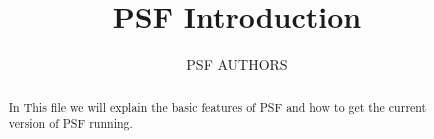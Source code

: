 \documentclass[a4paper,10pt]{article}
\title{PSF Introduction}
\author{PSF AUTHORS}
\begin{document}
\maketitle

\begin{abstract}
 In This file we will explain the basic features of PSF and how to get the current version of PSF running.
\end{abstract}








\end{document}
